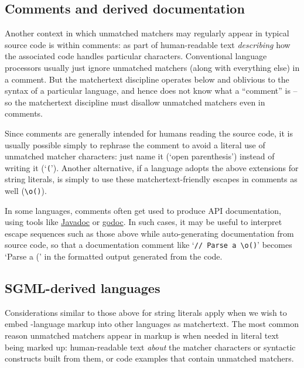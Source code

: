 

\subsection{Comments and derived documentation}

Another context in which unmatched matchers may regularly appear
in typical source code is within comments:
\eg as part of human-readable text \emph{describing}
how the associated code handles particular characters.
Conventional language processors usually just ignore unmatched matchers
(along with everything else) in a comment.
But the matchertext discipline operates below and oblivious to
the syntax of a particular language,
and hence does not know what a ``comment'' is --
so the matchertext discipline must disallow unmatched matchers even in comments.

Since comments are generally intended for humans reading the source code,
it is usually possible simply to rephrase the comment
to avoid a literal use of unmatched matcher characters:
\eg just name it (`open parenthesis')
instead of writing it (`\verb|(|').
Another alternative,
if a language adopts the above extensions for string literals,
is simply to use these matchertext-friendly escapes in comments as well
(\eg \verb|\o()|).

In some languages,
comments often get used to produce API documentation,
using tools like \href{https://www.oracle.com/java/technologies/javase/javadoc-tool.html}{Javadoc}
or \href{https://pkg.go.dev/golang.org/x/tools/cmd/godoc}{godoc}.
In such cases,
it may be useful to interpret escape sequences such as those above
while auto-generating documentation from source code,
so that a documentation comment like `\verb|// Parse a \o()|'
becomes `Parse a (' in the formatted output generated from the code.


\subsection{SGML-derived languages}

Considerations similar to those above for string literals
apply when we wish to embed \ml-language markup
into other languages as matchertext.
The most common reason unmatched matchers appear in markup
is when needed in literal text being marked up:
\eg human-readable text \emph{about} the matcher characters
or syntactic constructs built from them,
or code examples that contain unmatched matchers.

